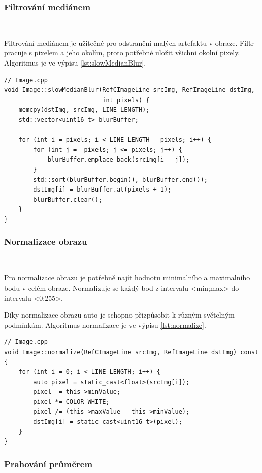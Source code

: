 \subsubsection{Filtrování mediánem}\

Filtrování mediánem je užitečné pro odstranění malých artefaktu v obraze.
Filtr pracuje s pixelem a jeho okolím, proto potřebné uložit všichni okolní
pixely. Algoritmus je ve výpisu \ref{lst:slowMedianBlur}\cite{draha}\cite{robot}.

\begin{lstlisting}[caption=Filtrování mediánem, label=lst:slowMedianBlur]
// Image.cpp
void Image::slowMedianBlur(RefCImageLine srcImg, RefImageLine dstImg,
                           int pixels) {
    memcpy(dstImg, srcImg, LINE_LENGTH);
    std::vector<uint16_t> blurBuffer;

    for (int i = pixels; i < LINE_LENGTH - pixels; i++) {
        for (int j = -pixels; j <= pixels; j++) {
            blurBuffer.emplace_back(srcImg[i - j]);
        }
        std::sort(blurBuffer.begin(), blurBuffer.end());
        dstImg[i] = blurBuffer.at(pixels + 1);
        blurBuffer.clear();
    }
}
\end{lstlisting}


\subsubsection{Normalizace obrazu}\

Pro normalizace obrazu je potřebně najít hodnotu minimalního a maximalního bodu v
celém obraze. Normalizuje se každý bod z intervalu <min;max>
do intervalu <0;255>.

Díky normalizace obrazu auto je schopno přizpůsobit k různým světelným podmínkám.
Algoritmus normalizace je ve výpisu \ref{lst:normalize}\cite{robot}.
\begin{lstlisting}[caption=Normalizace obrazu, label=lst:normalize]
// Image.cpp
void Image::normalize(RefCImageLine srcImg, RefImageLine dstImg) const {
    for (int i = 0; i < LINE_LENGTH; i++) {
        auto pixel = static_cast<float>(srcImg[i]);
        pixel -= this->minValue;
        pixel *= COLOR_WHITE;
        pixel /= (this->maxValue - this->minValue);
        dstImg[i] = static_cast<uint16_t>(pixel);
    }
}
\end{lstlisting}

\subsubsection{Prahování průměrem}\

